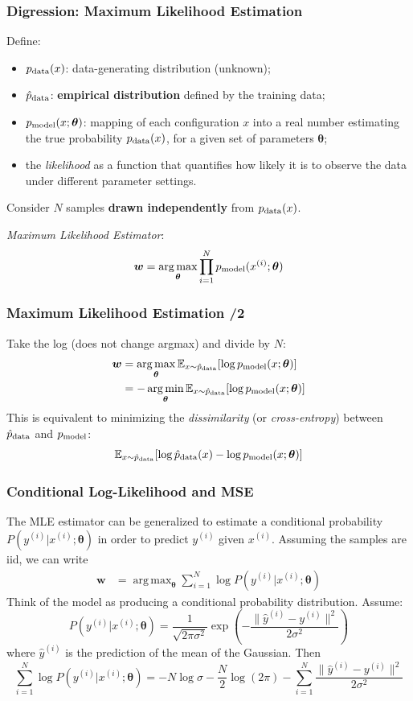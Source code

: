 \documentclass{beamer}
\DeclareMathOperator*{\argmax}{arg\,max}
\DeclareMathOperator*{\argmin}{arg\,min}
\begin{document}
	\begin{frame}
		\frametitle{Digression: Maximum Likelihood Estimation}
		Define:
		\begin{itemize}
			\item $p_{\rm data}(x)$: data-generating distribution (unknown);
			\item $\hat{p}_{\rm data}$: \textbf{empirical distribution} defined by the training data;
			\item $p_{\rm model}(x; \bm{\theta})$: mapping of each configuration $x$ into a real number estimating the true probability $p_{\rm data}(x)$, for a given set of parameters $\bm{\theta}$;
			\item the \textit{likelihood} as a function that quantifies how likely it is to observe the data under different parameter settings.
		\end{itemize}
		Consider $N$ samples \textbf{drawn independently} from 	$p_{\rm data}(x)$.
		
		\vspace{4mm}
		
		\textit{Maximum Likelihood Estimator}:
		$$ \bm{w} = \argmax_{\bm{\theta}} \prod_{i=1}^{N} p_{\rm model}(x^{(i)}; \bm{\theta}) $$
		
	\end{frame}
	\begin{frame}
		\frametitle{Maximum Likelihood Estimation /2}
Take the log (does not change argmax) and divide by $N$:
\begin{align*}
	\bm{w} &= \argmax_{\bm{\theta}}\mathbb{E}_{x \sim \hat{p}_{\rm data}} [\log p_{\rm model}(x; \bm{\theta})] \\
	&= -\argmin_{\bm{\theta}}\mathbb{E}_{x \sim \hat{p}_{\rm data}} [\log p_{\rm model}(x; \bm{\theta})]
\end{align*} 
This is equivalent to minimizing the \textit{dissimilarity} (or \textit{cross-entropy}) between $ \hat{p}_{\rm data}$ and $p_{\rm model}$:
$$ \mathbb{E}_{x \sim \hat{p}_{\rm data}} [\log \hat{p}_{\rm data}(x)-\log p_{\rm model}(x; \bm{\theta})] $$
	\end{frame}
	\begin{frame}
		\frametitle{Conditional Log-Likelihood and MSE}
		The MLE estimator can be generalized to estimate a conditional probability $P(y^{(i)} | x^{(i)}; \bm{\theta})$ in order to predict $y^{(i)}$ given $x^{(i)}$. Assuming the samples are iid, we can write
		\begin{align*}
			\bm{w} &= \argmax_{\bm{\theta}}\sum_{i=1}^{N}\log P(y^{(i)} | x^{(i)}; \bm{\theta})
		\end{align*} 
		Think of the model as producing a conditional probability distribution. Assume:
		$$ P(y^{(i)} | x^{(i)}; \bm{\theta}) = \frac{1}{\sqrt{2\pi\sigma^2}} \exp\left(-\frac{\|\hat{y}^{(i)}-y^{(i)}\|^2}{2\sigma^2}\right)$$
		where $\hat{y}^{(i)}$ is the prediction of the mean of the Gaussian. Then
		$$\sum_{i=1}^{N}\log P(y^{(i)} | x^{(i)}; \bm{\theta}) = -N\log \sigma - \frac{N}{2}\log (2\pi) - \sum_{i=1}^{N}\frac{\|\hat{y}^{(i)}-y^{(i)}\|^2}{2\sigma^2}$$
	\end{frame}
	
\end{document}
